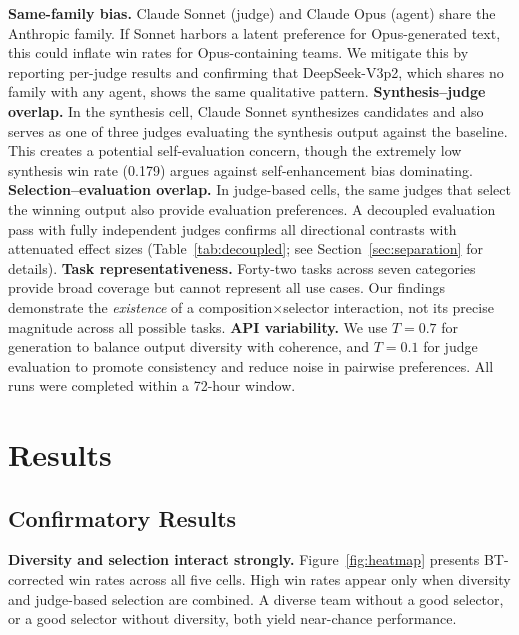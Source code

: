 \documentclass[10pt,twocolumn]{article}
\theoremstyle{remark}
\begin{document}
\textbf{Same-family bias.} Claude Sonnet (judge) and Claude Opus (agent) share the Anthropic family. If Sonnet harbors a latent preference for Opus-generated text, this could inflate win rates for Opus-containing teams. We mitigate this by reporting per-judge results and confirming that DeepSeek-V3p2, which shares no family with any agent, shows the same qualitative pattern. \textbf{Synthesis--judge overlap.} In the synthesis cell, Claude Sonnet synthesizes candidates and also serves as one of three judges evaluating the synthesis output against the baseline. This creates a potential self-evaluation concern, though the extremely low synthesis win rate (0.179) argues against self-enhancement bias dominating. \textbf{Selection--evaluation overlap.} In judge-based cells, the same judges that select the winning output also provide evaluation preferences. A decoupled evaluation pass with fully independent judges confirms all directional contrasts with attenuated effect sizes (Table~\ref{tab:decoupled}; see Section~\ref{sec:separation} for details). \textbf{Task representativeness.} Forty-two tasks across seven categories provide broad coverage but cannot represent all use cases. Our findings demonstrate the \emph{existence} of a composition$\times$selector interaction, not its precise magnitude across all possible tasks. \textbf{API variability.} We use $T = 0.7$ for generation to balance output diversity with coherence, and $T = 0.1$ for judge evaluation to promote consistency and reduce noise in pairwise preferences. All runs were completed within a 72-hour window.

\section{Results}
\label{sec:results}

\subsection{Confirmatory Results}
\label{sec:confirmatory}

\textbf{Diversity and selection interact strongly.} Figure~\ref{fig:heatmap} presents BT-corrected win rates across all five cells. High win rates appear only when diversity and judge-based selection are combined. A diverse team without a good selector, or a good selector without diversity, both yield near-chance performance.
\end{document}
